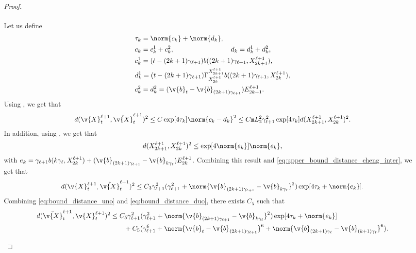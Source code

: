 \begin{proof}{}{}
\begin{enumerate}[wide, labelindent=0pt, label=(\alph*)]
\begin{align}
		      \end{align}
		      Let us define \begin{align}  & \tau_k = \norm{c_k} + \norm{d_k} , \\ &c_k = c_k^1 + c_k^2 , \qquad \qquad \qquad \qquad \ d_k = d_k^1 + d_k^2 ,\\ &c_k^1 = (t - (2k+1)\gamma_{\ell+1}) b((2k+1) \gamma_{\ell+1}, X_{2k+1}^{\ell+1}) , \\ &d_k^1 = (t - (2k+1)\gamma_{\ell+1}) \Gamma_{X_{2k}^{\ell+1}}^{X_{2k+1}^{\ell+1}}b((2k+1) \gamma_{\ell+1}, X_{2k}^{\ell+1}) , \\  & c_k^2 = d_k^2 = (\v{b}_{t} - \v{b}_{(2k+1) \gamma_{\ell+1}}) E_{2k+1}^{\ell+1} .
                 \label{eq:def_tau}
		      \end{align}
		      Using , we get that \begin{align} \label{eq:upper_bound_distance_cheng_inter} d(\v{X}_{t}^{\ell+1}, \hat{\v{X}}_{t}^{\ell+1})^2 \leq C \exp[4 \tau_k] \norm{c_k - d_k}^2 \leq C \mathtt{m}{L}_2^2 \gamma_{\ell+1}^2 \exp[4 \tau_k] d(X_{2k+1}^{\ell+1}, X_{2k}^{\ell+1})^2 .
		      \end{align}
		      In addition, using , we get that \begin{equation} d(X_{2k+1}^{\ell+1}, X_{2k}^{\ell+1})^2 \leq \exp[4 \norm{e_k}] \norm{e_k} , \end{equation} with $e_k = \gamma_{\ell+1}b(k\gamma_\ell, X_{2k}^{\ell+1}) + (\v{b}_{(2k+1)\gamma_{\ell+1}} - \v{b}_{k\gamma_{\ell}}) E_{2k}^{\ell+1}$.
		      Combining this result and \eqref{eq:upper_bound_distance_cheng_inter}, we get that \begin{equation} \label{eq:bound_distance_duo} d(\v{X}_{t}^{\ell+1}, \hat{\v{X}}_{t}^{\ell+1})^2 \leq C_3 \gamma_{\ell+1}^2 (\gamma_{\ell+1}^2 + \norm{\v{b}_{(2k+1)\gamma_{\ell+1}} - \v{b}_{k\gamma_{\ell}}}^2)\exp[4 \tau_k + \norm{e_k}] .
		      \end{equation}
		      Combining \eqref{eq:bound_distance_uno} and \eqref{eq:bound_distance_duo}, there exists $C_5$ such that \begin{align} d(\bar{\v{X}}_{t}^{\ell+1}, \v{X}_{t}^{\ell+1})^2 & \leq C_5 \gamma_{\ell+1}^2 (\gamma_{\ell+1}^2 + \norm{\v{b}_{(2k+1)\gamma_{\ell+1}} - \v{b}_{k\gamma_{\ell}}}^2)\exp[4 \tau_k + \norm{e_k}] \\  & \qquad + C_5 (\gamma_{\ell+1}^6 + \norm{\v{b}_{t} - \v{b}_{(2k+1) \gamma_{\ell+1}}}^6 + \norm{\v{b}_{(2k+1) \gamma_{\ell}} - \v{b}_{(k+1) \gamma_{\ell}}}^6) .
                 \label{eq:case_complete_2}
		      \end{align}


\end{enumerate}
\end{proof}
